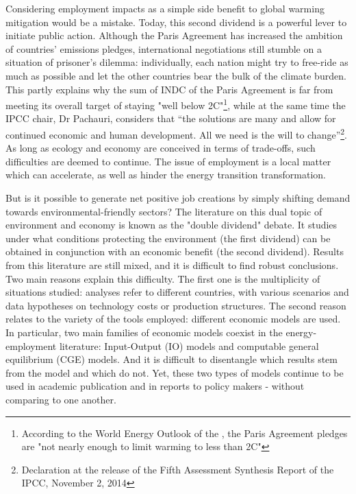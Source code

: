 Considering employment impacts as a simple side benefit to global warming mitigation would be a mistake. Today, this second dividend is a powerful lever to initiate public action. Although the Paris Agreement has increased the ambition of countries' emissions pledges, international negotiations still stumble on a situation of prisoner's dilemma: individually, each nation might try to free-ride as much as possible and let the other countries bear the bulk of the climate burden. This partly explains why the sum of INDC of the Paris Agreement is far from meeting its overall target of staying "well below 2\degree C"\footnote{According to the World Energy Outlook of the \citet{OECD/IEA2016}, the Paris Agreement pledges are "not nearly enough to limit warming to less than 2\degree C"}, while at the same time the IPCC chair, Dr Pachauri, considers that “the solutions are many and allow for continued economic and human development. All we need is the will to change”\footnote{Declaration at the release of the Fifth Assessment Synthesis Report of the IPCC, November 2, 2014}.
As long as ecology and economy are conceived in terms of trade-offs, such difficulties are deemed to continue. The issue of employment is a local matter which can accelerate, as well as hinder the energy transition transformation. 

But is it possible to generate net positive job creations by simply shifting demand towards environmental-friendly sectors? 
The literature on this dual topic of environment and economy is known as the "double dividend" debate. It studies under what conditions protecting the environment (the first dividend) can be obtained in conjunction with an economic benefit (the second dividend).
Results from this literature are still mixed, and it is difficult to find robust conclusions. Two main reasons explain this difficulty. The first one is the multiplicity of situations studied: analyses refer to different countries, with various scenarios and data hypotheses on technology costs or production structures. The second reason relates to the variety of the tools employed: different economic models are used. In particular, two main families of economic models coexist in the energy-employment literature: Input-Output (IO) models and computable general equilibrium (CGE) models. And it is difficult to disentangle which results stem from the model and which do not. Yet, these two types of models continue to be used in academic publication and in reports to policy makers - without comparing to one another.

